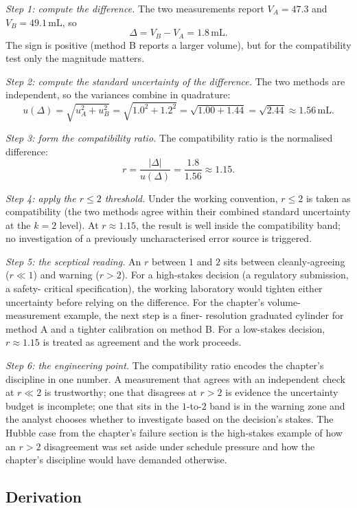 \emph{Step 1: compute the difference.} The two measurements report
$V_{A} = 47.3$ and $V_{B} = 49.1\,\si{\milli\liter}$, so
\[
\Delta = V_{B} - V_{A} = 1.8\,\si{\milli\liter}.
\]
The sign is positive (method B reports a larger volume), but for
the compatibility test only the magnitude matters.

\emph{Step 2: compute the standard uncertainty of the difference.}
The two methods are independent, so the variances combine in
quadrature:
\[
u(\Delta) = \sqrt{u_{A}^{2} + u_{B}^{2}} = \sqrt{1.0^{2} +
1.2^{2}} = \sqrt{1.00 + 1.44} = \sqrt{2.44} \approx 1.56\,\si{
\milli\liter}.
\]

\emph{Step 3: form the compatibility ratio.} The compatibility
ratio is the normalised difference:
\[
r = \frac{|\Delta|}{u(\Delta)} = \frac{1.8}{1.56} \approx 1.15.
\]

\emph{Step 4: apply the $r \leq 2$ threshold.} Under the working
convention, $r \leq 2$ is taken as compatibility (the two methods
agree within their combined standard uncertainty at the $k = 2$
level). At $r \approx 1.15$, the result is well inside the
compatibility band; no investigation of a previously
uncharacterised error source is triggered.

\emph{Step 5: the sceptical reading.} An $r$ between $1$ and $2$
sits between cleanly-agreeing ($r \ll 1$) and warning ($r > 2$).
For a high-stakes decision (a regulatory submission, a safety-
critical specification), the working laboratory would tighten
either uncertainty before relying on the difference. For the
chapter's volume-measurement example, the next step is a finer-
resolution graduated cylinder for method A and a tighter
calibration on method B. For a low-stakes decision, $r \approx
1.15$ is treated as agreement and the work proceeds.

\emph{Step 6: the engineering point.} The compatibility ratio
encodes the chapter's discipline in one number. A measurement that
agrees with an independent check at $r \ll 2$ is trustworthy; one
that disagrees at $r > 2$ is evidence the uncertainty budget is
incomplete; one that sits in the $1$-to-$2$ band is in the
warning zone and the analyst chooses whether to investigate based
on the decision's stakes. The Hubble case from the chapter's
failure section is the high-stakes example of how an $r > 2$
disagreement was set aside under schedule pressure and how the
chapter's discipline would have demanded otherwise.

\subsection*{Derivation}


